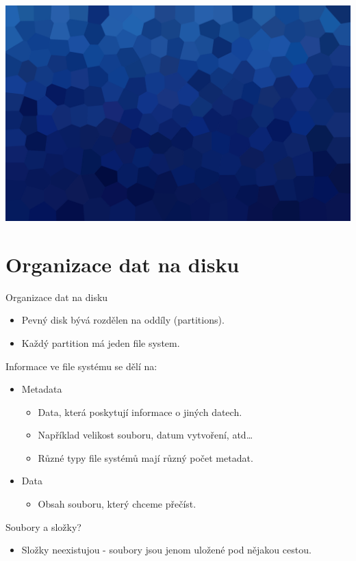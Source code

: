 \documentclass[aspectratio=169,xcolor=dvipsnames, t]{beamer}
\begin{document}
{
{
    \includegraphics[width=\paperwidth,height=\paperheight]{AICStyleData/logos/mene_polygonu_bg.png}
}
\section{Organizace dat na disku}
\begin{frame}{Organizace dat na disku}
\begin{itemize}
    \item Pevný disk bývá rozdělen na oddíly (partitions).
    \item Každý partition má jeden file system.
\end{itemize}
Informace ve file systému se dělí na:
\begin{itemize}
    \item Metadata
    \begin{itemize}
        \item Data, která poskytují informace o jiných datech.
        \item Například velikost souboru, datum vytvoření, atd\dots
        \item Různé typy file systémů mají různý počet metadat.
    \end{itemize}
    \item Data
    \begin{itemize}
        \item Obsah souboru, který chceme přečíst.
    \end{itemize}
\end{itemize}
Soubory a složky?
\begin{itemize}
    \item Složky neexistujou - soubory jsou jenom uložené pod nějakou cestou.
\end{itemize}
\end{frame}
}
\end{document}
